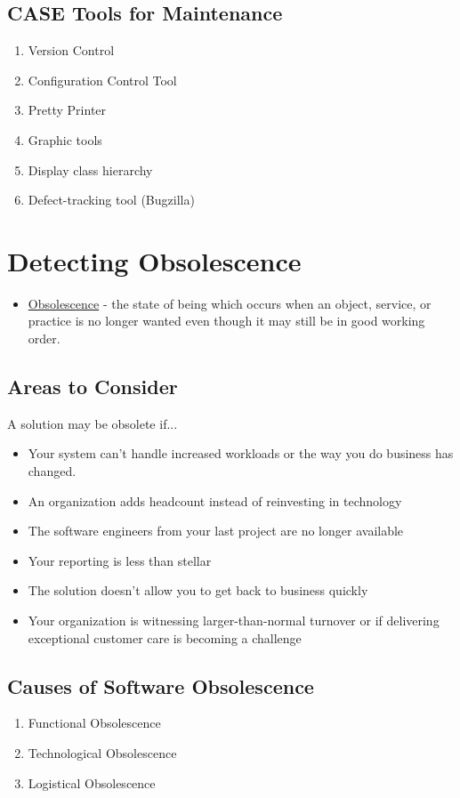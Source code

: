 \documentclass{report}
\begin{document}
		\section{CASE Tools for Maintenance}
		    \begin{enumerate}
		    	\item Version Control
		    	\item Configuration Control Tool
		    	\item Pretty Printer
		    	\item Graphic tools
		    	\item Display class hierarchy
		    	\item Defect-tracking tool (Bugzilla)
		    \end{enumerate}
	\chapter{Detecting Obsolescence}
		\begin{itemize}
			\item \underline{Obsolescence} - the state of being which occurs when an object, service, or practice is no longer wanted even though it may still be in good working order.
		\end{itemize}
		\section{Areas to Consider}
			A solution may be obsolete if...
		    \begin{itemize}
		    	\item Your system can't handle increased workloads or the way you do business has changed.
		    	\item An organization adds headcount instead of reinvesting in technology
		    	\item The software engineers from your last project are no longer available
		    	\item Your reporting is less than stellar
		    	\item The solution doesn't allow you to get back to business quickly
		    	\item Your organization is witnessing larger-than-normal turnover or if delivering exceptional customer care is becoming a challenge
		    \end{itemize}
		\section{Causes of Software Obsolescence}
		    \begin{enumerate}
		    	\item Functional Obsolescence
		    	\item Technological Obsolescence
		    	\item Logistical Obsolescence
		    \end{enumerate}
\end{document}
